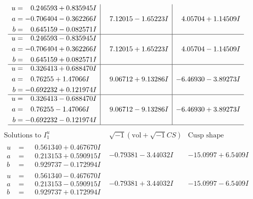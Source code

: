 \documentclass[1p]{elsarticle_modified}
\theoremstyle{definition}
\newcommand{\I}{\sqrt{-1}}
\begin{document}
$$\begin{array}{c|c|c}
\begin{aligned}
u &= \phantom{-}0.246593 + 0.835945 I \\
a &= -0.706404 - 0.362266 I \\
b &= \phantom{-}0.645159 - 0.082571 I\end{aligned}
 & \phantom{-}7.12015 - 1.65223 I & \phantom{-}4.05704 + 1.14509 I \\ \hline\begin{aligned}
u &= \phantom{-}0.246593 - 0.835945 I \\
a &= -0.706404 + 0.362266 I \\
b &= \phantom{-}0.645159 + 0.082571 I\end{aligned}
 & \phantom{-}7.12015 + 1.65223 I & \phantom{-}4.05704 - 1.14509 I \\ \hline\begin{aligned}
u &= \phantom{-}0.326413 + 0.688470 I \\
a &= \phantom{-}0.76255 + 1.47066 I \\
b &= -0.692232 + 0.121974 I\end{aligned}
 & \phantom{-}9.06712 + 9.13286 I & -6.46930 - 3.89273 I \\ \hline\begin{aligned}
u &= \phantom{-}0.326413 - 0.688470 I \\
a &= \phantom{-}0.76255 - 1.47066 I \\
b &= -0.692232 - 0.121974 I\end{aligned}
 & \phantom{-}9.06712 - 9.13286 I & -6.46930 + 3.89273 I\\
 \hline 
 \end{array}$$\newpage$$\begin{array}{c|c|c}  
\text{Solutions to }I^u_{1}& \I (\text{vol} + \sqrt{-1}CS) & \text{Cusp shape}\\
 \hline 
\begin{aligned}
u &= \phantom{-}0.561340 + 0.467670 I \\
a &= \phantom{-}0.213153 + 0.590915 I \\
b &= \phantom{-}0.929737 - 0.172994 I\end{aligned}
 & -0.79381 - 3.44032 I & -15.0997 + 6.5409 I \\ \hline\begin{aligned}
u &= \phantom{-}0.561340 - 0.467670 I \\
a &= \phantom{-}0.213153 - 0.590915 I \\
b &= \phantom{-}0.929737 + 0.172994 I\end{aligned}
 & -0.79381 + 3.44032 I & -15.0997 - 6.5409 I \\ \hline\begin{aligned}

\end{aligned}
\end{array}$$
\end{document}
